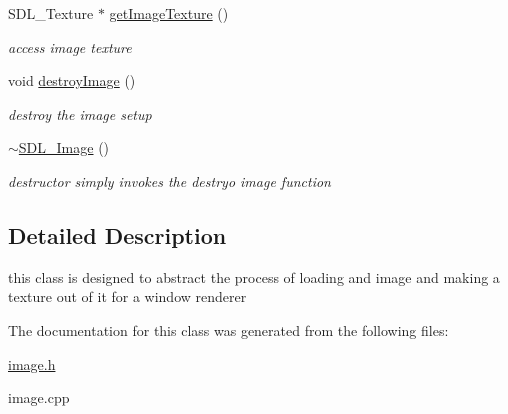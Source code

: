 \begin{DoxyCompactItemize}
\hypertarget{class_s_d_l___image_a57ef1d2f72419dcd3a84ab8059fadf46}{}\label{class_s_d_l___image_a57ef1d2f72419dcd3a84ab8059fadf46} 
S\+D\+L\+\_\+\+Texture $\ast$ \hyperlink{class_s_d_l___image_a57ef1d2f72419dcd3a84ab8059fadf46}{get\+Image\+Texture} ()
\begin{DoxyCompactList}\small\item\em access image texture \end{DoxyCompactList}\item 
\hypertarget{class_s_d_l___image_a8ca33a51cf09e6c6299aac9e81d46c2f}{}\label{class_s_d_l___image_a8ca33a51cf09e6c6299aac9e81d46c2f} 
void \hyperlink{class_s_d_l___image_a8ca33a51cf09e6c6299aac9e81d46c2f}{destroy\+Image} ()
\begin{DoxyCompactList}\small\item\em destroy the image setup \end{DoxyCompactList}\item 
\hypertarget{class_s_d_l___image_acaf74b72cd075afe6b60a2ac359836e7}{}\label{class_s_d_l___image_acaf74b72cd075afe6b60a2ac359836e7} 
\hyperlink{class_s_d_l___image_acaf74b72cd075afe6b60a2ac359836e7}{$\sim$\+S\+D\+L\+\_\+\+Image} ()
\begin{DoxyCompactList}\small\item\em destructor simply invokes the destryo image function \end{DoxyCompactList}\end{DoxyCompactItemize}


\subsection{Detailed Description}
this class is designed to abstract the process of loading and image and making a texture out of it for a window renderer 

The documentation for this class was generated from the following files\+:\begin{DoxyCompactItemize}
\item 
\hyperlink{image_8h}{image.\+h}\item 
image.\+cpp\end{DoxyCompactItemize}
